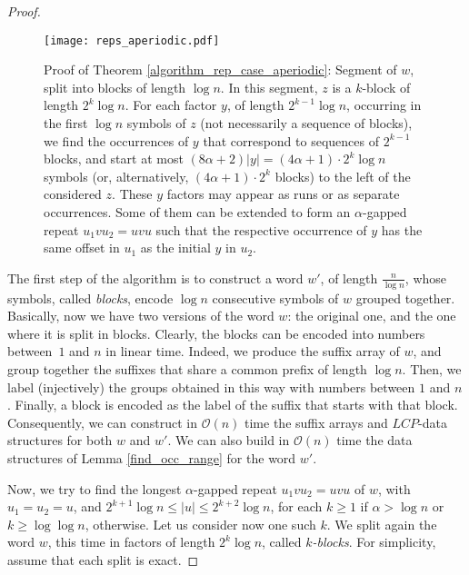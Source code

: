 \documentclass[final]{dmtcs-episciences}
\newcommand{\bigo}{{\mathcal O}}
\newcommand{\LCP}{{\mathit{LCP}}}
\begin{document}
\begin{proof}
\begin{figure}
\begin{center}
\texttt{[image: reps\_aperiodic.pdf]}
\end{center}
\caption{
Proof of Theorem \ref{algorithm_rep_case_aperiodic}: Segment of $w$, split into blocks of length $\log n$. In this segment, $z$ is a $k$-block of length $2^k\log n$. For each factor $y$, of length $2^{k-1}\log n$, occurring in the first $\log n$ symbols of $z$ (not necessarily a sequence of blocks), we find the occurrences of $y$ that correspond to sequences of $2^{k-1}$ blocks, and start at most $(8\alpha+2)|y|=(4\alpha+1)\cdot 2^{k}\log n$ symbols (or, alternatively, $(4\alpha +1)\cdot 2^{k}$ blocks) to the left of the considered $z$. These $y$ factors may appear as runs or as separate occurrences. Some of them can be extended to form an $\alpha$-gapped repeat $u_1vu_2=uvu$ such that the respective occurrence of $y$ has the same offset in $u_1$ as the initial $y$ in $u_2$.}
\label{aper}
\end{figure} 

The first step of the algorithm is to construct a word $w'$, of length $\frac{n}{\log n}$, whose symbols, called {\em blocks}, encode $\log n $ consecutive symbols of $w$ grouped together. Basically, now we have two versions of the word $w$: the original one, and the one where it is split in blocks. Clearly, the blocks can be encoded into numbers between~$1$ and $n$ in linear time. Indeed, we produce the suffix array of $w$, and group together the suffixes that share a common prefix of length $\log n$. Then, we label (injectively) the groups obtained in this way with numbers between $1$ and $n$. Finally, a block is encoded as the label of the suffix that starts with that block. Consequently, we can construct in $\bigo(n)$ time the suffix arrays and $\LCP$-data structures for both $w$ and $w'$. We can also build in $\bigo(n)$ time the data structures of Lemma \ref{find_occ_range} for the word $w'$. 

Now, we try to find the longest $\alpha$-gapped repeat $u_1vu_2=uvu$ of $w$, with $u_1=u_2=u$, and $2^{k+1} \log n \leq |u| \leq 2^{k+2}\log n$, for each $k\geq 1$ if $\alpha>\log n$ or $k\geq \log \log n$, otherwise. Let us consider now one such $k$. We split again the word $w$, this time in factors of length $2^k \log n$, called {\em $k$-blocks}. For simplicity, assume that each split is exact. 


\end{proof}
\end{document}

